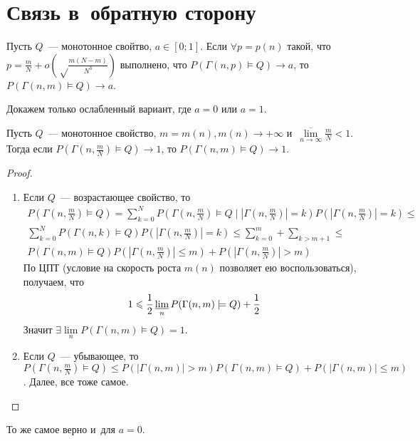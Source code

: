 \documentclass{article}
\begin{document}
\section{Связь в~обратную сторону}

\begin{lemma}
	Пусть $Q$~--- монотонное свойтво, $a \in [0; 1]$. Если $\forall p = p(n)$
	такой, что $p = \frac{m}{N} + o(\sqrt\frac{m(N-m)}{N^3})$ выполнено, что
	$P(\Gamma(n, p) \models Q) \rightarrow a$, то $P(\Gamma(n, m) \models Q)
	\rightarrow a$.
\end{lemma}

Докажем только ослабленный вариант, где $a = 0$ или $a = 1$.

\begin{lemma}
	Пусть $Q$~--- монотонное свойство, $m = m(n), m(n) \rightarrow +\infty$
	и~$\overline{\lim\limits_{n\rightarrow \infty}} \frac{m}{N} < 1$. Тогда если
	$P(\Gamma(n, \frac{m}{N}) \models Q) \rightarrow 1$, то $P(\Gamma(n, m)
	\models Q) \rightarrow 1$.
\end{lemma}
\begin{proof}~\\
	\begin{enumerate}
		\item Если $Q$~--- возрастающее свойство, то
			\begin{align*}
				P(\Gamma(n, \frac{m}{N}) \models Q) = \sum\limits_{k=0}^N P(\Gamma(n,
				\frac{m}{N}) \models Q \mid |\Gamma(n, \frac{m}{N})| = k) P(|\Gamma(n,
				\frac{m}{N})| = k) \le \\
				\sum\limits_{k=0}^N P(\Gamma(n, k) \models Q) P(|\Gamma(n, \frac{m}{N})|
				= k) \le \sum\limits_{k=0}^m + \sum\limits_{k>m+1} \le\\
				P(\Gamma(n, m) \models Q) P(|\Gamma(n, \frac{m}{N})| \le m) + P(|\Gamma(n,
				\frac{m}{N})| > m)
			\end{align*}
			По ЦПТ (условие на скорость роста $m(n)$ позволяет ею воспользоваться),
			получаем, что
			$$1 \leqslant \frac{1}{2} \operatorname*{\underline{lim}}\limits_n P(\Gamma(n, m) \models Q) +
			\frac{1}{2} $$
			Значит $\exists\lim\limits_n P(\Gamma(n, m) \models Q) = 1$.
		\item
			Если $Q$~--- убывающее, то $P(\Gamma(n, \frac{m}{N}) \models Q) \le
			P(|\Gamma(n, m)| > m) P(\Gamma(n, m) \models Q) + P(|\Gamma(n, m)| \le
			m)$. Далее, все тоже самое.
	\end{enumerate}
\end{proof}

\begin{corollary}
	То же самое верно и~для $a = 0$.
\end{corollary}
\end{document}

